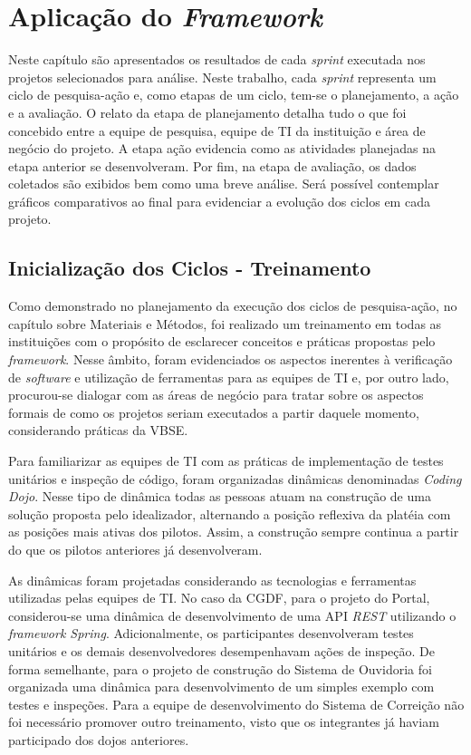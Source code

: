 \chapter{Aplicação do \textit{Framework}}

Neste capítulo são apresentados os resultados de cada \textit{sprint} executada nos projetos selecionados para análise. Neste trabalho, cada \textit{sprint} representa um ciclo de pesquisa-ação e, como etapas de um ciclo, tem-se o planejamento, a ação e a avaliação. O relato da etapa de planejamento detalha tudo o que foi concebido entre a equipe de pesquisa, equipe de TI da instituição e área de negócio do projeto. A etapa ação evidencia como as atividades planejadas na etapa anterior se desenvolveram. Por fim, na etapa de avaliação, os dados coletados são exibidos bem como uma breve análise. Será possível contemplar gráficos comparativos ao final para evidenciar a evolução dos ciclos em cada projeto.

\section{Inicialização dos Ciclos - Treinamento}

Como demonstrado no planejamento da execução dos ciclos de pesquisa-ação, no capítulo sobre Materiais e Métodos, foi realizado um treinamento em todas as instituições com o propósito de esclarecer conceitos e práticas propostas pelo \textit{framework}. Nesse âmbito, foram evidenciados os aspectos inerentes à verificação de \textit{software} e utilização de ferramentas para as equipes de TI e, por outro lado, procurou-se dialogar com as áreas de negócio para tratar sobre os aspectos formais de como os projetos seriam executados a partir daquele momento, considerando práticas da VBSE.

Para familiarizar as equipes de TI com as práticas de implementação de testes unitários e inspeção de código, foram organizadas dinâmicas denominadas \textit{Coding Dojo}. Nesse tipo de dinâmica todas as pessoas atuam na construção de uma solução proposta pelo idealizador, alternando a posição reflexiva da platéia com as posições mais ativas dos pilotos. Assim, a construção sempre continua a partir do que os pilotos anteriores já desenvolveram.

As dinâmicas foram projetadas considerando as tecnologias e ferramentas utilizadas pelas equipes de TI. No caso da CGDF, para o projeto do Portal, considerou-se uma dinâmica de desenvolvimento de uma API \textit{REST} utilizando o \textit{framework Spring}. Adicionalmente, os participantes desenvolveram testes unitários e os demais desenvolvedores desempenhavam ações de inspeção. De forma semelhante, para o projeto de construção do Sistema de Ouvidoria foi organizada uma dinâmica para desenvolvimento de um simples exemplo com testes e inspeções. Para a equipe de desenvolvimento do Sistema de Correição não foi necessário promover outro treinamento, visto que os integrantes já haviam participado dos dojos anteriores.

